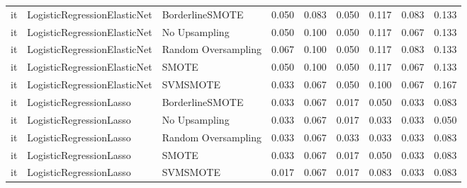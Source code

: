\begin{tabular}{lllllllll}
      it &    LogisticRegressionElasticNet &               BorderlineSMOTE &     0.050 &                     0.083 &                 0.050 &                  0.117 &                                   0.083 &     0.133 \\
      it &    LogisticRegressionElasticNet &                 No Upsampling &     0.050 &                     0.100 &                 0.050 &                  0.117 &                                   0.067 &     0.133 \\
      it &    LogisticRegressionElasticNet &           Random Oversampling &     0.067 &                     0.100 &                 0.050 &                  0.117 &                                   0.083 &     0.133 \\
      it &    LogisticRegressionElasticNet &                         SMOTE &     0.050 &                     0.100 &                 0.050 &                  0.117 &                                   0.067 &     0.133 \\
      it &    LogisticRegressionElasticNet &                      SVMSMOTE &     0.033 &                     0.067 &                 0.050 &                  0.100 &                                   0.067 &     0.167 \\
      it &         LogisticRegressionLasso &               BorderlineSMOTE &     0.033 &                     0.067 &                 0.017 &                  0.050 &                                   0.033 &     0.083 \\
      it &         LogisticRegressionLasso &                 No Upsampling &     0.033 &                     0.067 &                 0.017 &                  0.033 &                                   0.033 &     0.050 \\
      it &         LogisticRegressionLasso &           Random Oversampling &     0.033 &                     0.067 &                 0.033 &                  0.033 &                                   0.033 &     0.083 \\
      it &         LogisticRegressionLasso &                         SMOTE &     0.033 &                     0.067 &                 0.017 &                  0.050 &                                   0.033 &     0.083 \\
      it &         LogisticRegressionLasso &                      SVMSMOTE &     0.017 &                     0.067 &                 0.017 &                  0.083 &                                   0.033 &     0.083 \\

\end{tabular}
